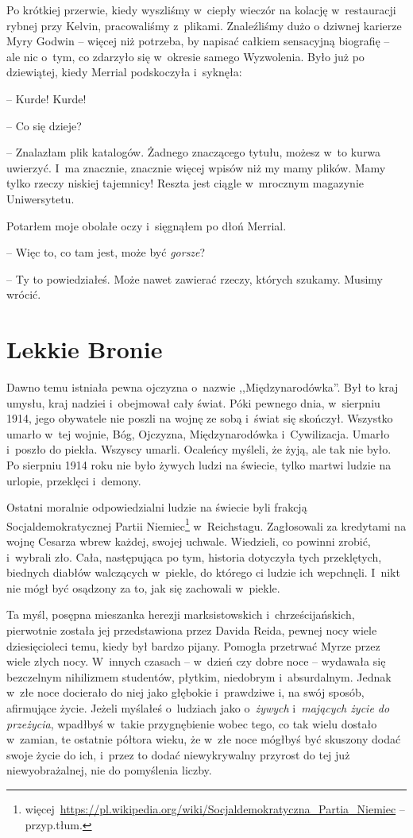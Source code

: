 \documentclass[oneside,polish,11pt,sfheadings]{mwbk}
\begin{document}
Po krótkiej przerwie, kiedy wyszliśmy w~ciepły wieczór na kolację w~restauracji rybnej przy Kelvin, pracowaliśmy z~plikami. Znaleźliśmy dużo
o dziwnej karierze Myry Godwin -- więcej niż potrzeba, by napisać całkiem
sensacyjną biografię -- ale nic o~tym, co zdarzyło się w~okresie samego
Wyzwolenia. Było już po dziewiątej, kiedy Merrial podskoczyła i~syknęła:

-- Kurde! Kurde!

-- Co się dzieje?

-- Znalazłam plik katalogów. Żadnego znaczącego tytułu, możesz w~to kurwa
uwierzyć. I~ma znacznie, znacznie więcej wpisów niż my mamy plików. Mamy
tylko rzeczy niskiej tajemnicy! Reszta jest ciągle w~mrocznym magazynie
Uniwersytetu.

Potarłem moje obolałe oczy i~sięgnąłem po dłoń Merrial. 

-- Więc to, co
tam jest, może być \textit{gorsze}?

-- Ty to powiedziałeś. Może nawet zawierać rzeczy, których szukamy.
Musimy wrócić.


\chapter{Lekkie Bronie}

Dawno temu istniała pewna ojczyzna o~nazwie ,,Międzynarodówka''. Był to kraj
umysłu, kraj nadziei i~obejmował cały świat. Póki pewnego dnia, w~sierpniu 1914, jego obywatele nie poszli na wojnę ze sobą i~świat się
skończył. Wszystko umarło w~tej wojnie, Bóg, Ojczyzna, Międzynarodówka i~Cywilizacja. Umarło i~poszło do piekła. Wszyscy umarli. Ocaleńcy
myśleli, że żyją, ale tak nie było. Po sierpniu 1914 roku nie było
żywych ludzi na świecie, tylko martwi ludzie na urlopie, przeklęci i~demony.

Ostatni moralnie odpowiedzialni ludzie na świecie byli frakcją
Socjaldemokratycznej Partii Niemiec\footnote{
więcej~\url{https://pl.wikipedia.org/wiki/Socjaldemokratyczna\_Partia\_Niemiec}
-- przyp.tłum.} w~Reichstagu. Zagłosowali za kredytami na wojnę Cesarza
wbrew każdej, swojej uchwale. Wiedzieli, co powinni zrobić, i~wybrali
zło. Cała, następująca po tym, historia dotyczyła tych przeklętych, biednych
diabłów walczących w~piekle, do którego ci ludzie ich wepchnęli. I~nikt
nie mógł być osądzony za to, jak się zachowali w~piekle.

Ta myśl, posępna mieszanka herezji marksistowskich i~chrześcijańskich,
pierwotnie została jej przedstawiona przez Davida Reida, pewnej nocy
wiele dziesięcioleci temu, kiedy był bardzo pijany. Pomogła przetrwać
Myrze przez wiele złych nocy. W~innych czasach -- w~dzień czy dobre noce
-- wydawała się bezczelnym nihilizmem studentów, płytkim, niedobrym i~absurdalnym. Jednak w~złe noce docierało do niej jako głębokie i~prawdziwe i, na swój sposób, afirmujące życie. Jeżeli myślałeś o~ludziach jako o~\textit{żywych} i~\textit{mających życie do przeżycia},
wpadłbyś w~takie przygnębienie wobec tego, co tak wielu dostało w~zamian,
te ostatnie półtora wieku, że w~złe noce mógłbyś być skuszony dodać
swoje życie do ich, i~przez to dodać niewykrywalny przyrost do tej już
niewyobrażalnej, nie do pomyślenia liczby.
\end{document}
